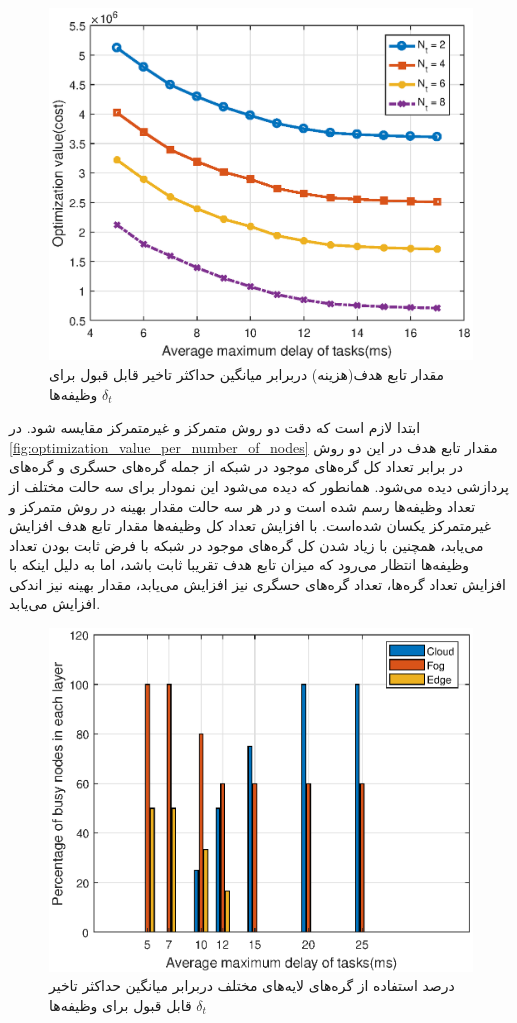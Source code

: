 \begin{figure}[h!]
	\centerline{\includegraphics[width=12cm]{graphics/3-cent-decent/optimization_value_per_delay_for_dif_Nt}}
	\caption{مقدار تابع هدف(هزینه) دربرابر میانگین حداکثر تاخیر قابل قبول برای وظیفه‌ها $\delta_t$}
	\label{fig:optimization_value_per_delay_for_dif_Nt}
\end{figure}
	
	ابتدا لازم است که دقت دو روش متمرکز و غیرمتمرکز مقایسه شود. در \cref{fig:optimization_value_per_number_of_nodes} مقدار تابع هدف در این دو روش در برابر تعداد کل گره‌های موجود در شبکه از جمله گره‌های حسگری و گره‌های پردازشی دیده می‌شود. همانطور که دیده می‌شود این نمودار برای سه حالت مختلف از تعداد وظیفه‌ها رسم شده است و در هر سه حالت مقدار بهینه در روش متمرکز و غیرمتمرکز یکسان شده‌است. با افزایش تعداد کل وظیفه‌ها مقدار تابع هدف افزایش می‌یابد، همچنین با زیاد شدن کل گره‌های موجود در شبکه با فرض ثابت بودن تعداد وظیفه‌ها انتظار می‌رود که میزان تابع هدف تقریبا ثابت باشد، اما به دلیل اینکه با افزایش تعداد گره‌ها، تعداد گره‌های حسگری نیز افزایش می‌یابد، مقدار بهینه نیز اندکی افزایش می‌یابد. 

\begin{figure}[h!]
	\centerline{\includegraphics[width=12cm]{graphics/3-cent-decent/busynodes_per_delay}}
	\caption{درصد استفاده از گره‌های لایه‌های مختلف دربرابر میانگین حداکثر تاخیر قابل قبول برای وظیفه‌ها $\delta_t$}
	\label{fig:busynodes_per_delay}
\end{figure}

